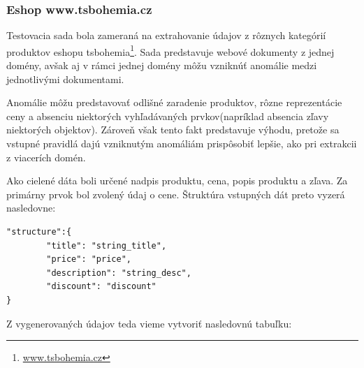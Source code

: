 \newpage

\subsubsection{Eshop www.tsbohemia.cz}

Testovacia sada bola zameraná na extrahovanie údajov z rôznych kategórií produktov eshopu tsbohemia\footnote{\url{www.tsbohemia.cz}}. Sada predstavuje webové dokumenty z jednej domény, avšak aj v rámci jednej domény môžu vzniknúť anomálie medzi jednotlivými dokumentami.

Anomálie môžu predstavovať odlišné zaradenie produktov, rôzne reprezentácie ceny a absenciu niektorých vyhľadávaných prvkov(napríklad absencia zľavy niektorých objektov). Zároveň však tento fakt predstavuje výhodu, pretože sa vstupné pravidlá dajú vzniknutým anomáliám prispôsobiť lepšie, ako pri extrakcii z viacerích domén.

\bigskip

Ako cielené dáta boli určené nadpis produktu, cena, popis produktu a zľava. Za primárny prvok bol zvolený údaj o cene. Štruktúra vstupných dát preto vyzerá nasledovne:

\bigskip

\begin{lstlisting}
"structure":{
        "title": "string_title",
        "price": "price",
        "description": "string_desc",
        "discount": "discount"
}
\end{lstlisting}

\bigskip

Z vygenerovaných údajov teda vieme vytvoriť nasledovnú tabuľku:

